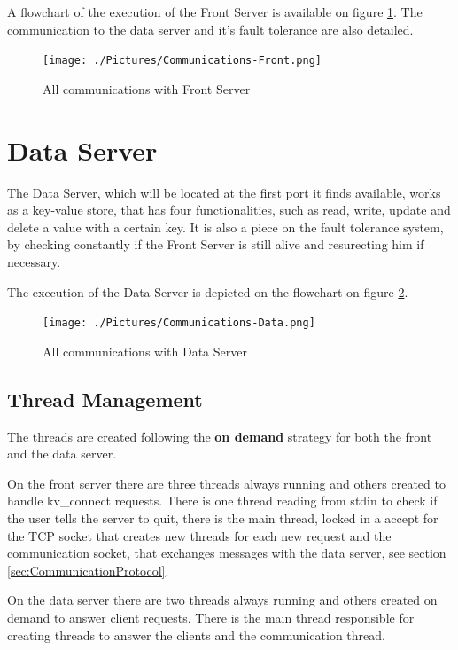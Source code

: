 \documentclass[12pt]{article} %
\begin{document}
A flowchart of the execution of the Front Server is available on figure \ref{fig:CommunicationsFront}. 
The communication to the data server and it's fault tolerance are also detailed.

\begin{figure}[ht]
\centering
\texttt{[image: ./Pictures/Communications-Front.png]}
\caption{All communications with Front Server}\label{fig:CommunicationsFront}
\end{figure}

\section{Data Server}
\label{sec:DataServer}

The Data Server, which will be located at the first port it finds available, 
works as a key-value store, that has four functionalities, such as read, 
write, update and delete a value with a certain key. It is also a piece on the fault tolerance system,
by checking constantly if the Front Server is still alive and resurecting him if necessary.

The execution of the Data Server is depicted on the flowchart on figure \ref{fig:CommunicationsData}.

\begin{figure}[ht]
\centering
\texttt{[image: ./Pictures/Communications-Data.png]}
\caption{All communications with Data Server}\label{fig:CommunicationsData}
\end{figure}

\subsection{Thread Management}
\label{sub:ThreadManagement}

The threads are created following the \textbf{on demand} strategy for both the front and 
the data server.

On the front server there are three threads always running and others created 
to handle kv\_connect requests. There is one thread reading from stdin to check if 
the user tells the server to quit, there is the main thread, locked in a accept for the 
TCP socket that creates new threads for each new request and the communication 
socket, that exchanges messages with the data server, see section \ref{sec:CommunicationProtocol}.

On the data server there are two threads always running and others created 
on demand to answer client requests. There is the main thread responsible for 
creating threads to answer the clients and the communication thread.
\end{document}
